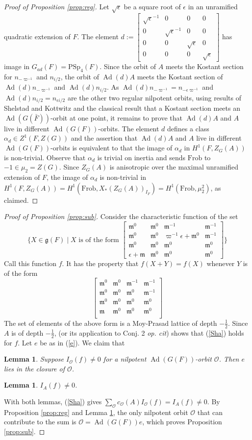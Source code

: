 \documentclass[11pt]{amsart}
\newtheorem{lemma}[theorem]{Lemma}
\theoremstyle{remark}
\newcommand{\cO}{\mathcal{O}}
\newcommand{\Ad}{\operatorname{Ad}}
\newcommand{\Frob}{\mathrm{Frob}}
\newcommand{\fg}{\mathfrak{g}}
\newcommand{\fm}{\mathfrak{m}}
\newcommand{\matr}[1]{\left[\begin{matrix}#1\end{matrix}\right]}
\newcommand{\PSp}{\mathrm{PSp}}
\begin{document}
\begin{proof}[Proof of Proposition \ref{prop:reg}]
Let $\sqrt{\epsilon}$ be a square root of $\epsilon$ in an unramified quadratic extension of $F$. The element $d:=\matr{
\sqrt{\epsilon}^{-1}&0&0&0\\
0&\sqrt{\epsilon}^{-1}&0&0\\
0&0&\sqrt{\epsilon}&0\\
0&0&0&\sqrt{\epsilon}
}$ has image in $G_{ad}(F)=\PSp_4(F)$. Since the orbit of $A$ meets the Kostant section for $n_{-\varpi^{-1}}$ and $n_{i/2}$, the orbit of $\Ad(d)A$ meets the Kostant section of $\Ad(d)n_{-\varpi^{-1}}$ and $\Ad(d)n_{i/2}$. As $\Ad(d)n_{-\varpi^{-1}}=n_{-\epsilon \varpi^{-1}}$ and $\Ad(d)n_{i/2}=n_{\epsilon i/2}$ are the other two regular nilpotent orbits, using results of Shelstad and Kottwitz and the classical result that a Kostant section meets an $\Ad(G(\bar{F}))$-orbit at one point, it remains to prove that $\Ad(d)A$ and $A$ live in different $\Ad(G(F))$-orbits. The element $d$ defines a class $\alpha_d\in Z^1(F,Z(G))$ and the assertion that $\Ad(d)A$ and $A$ live in different $\Ad(G(F))$-orbits is equivalent to that the image of $\alpha_d$ in $H^1(F,Z_G(A))$ is non-trivial. Observe that $\alpha_d$ is trivial on inertia and sends $\Frob$ to $-1\in\mu_2=Z(G)$. Since $Z_G(A)$ is anisotropic over the maximal unramified extension of $F$, the image of $\alpha_d$ is non-trivial in $H^1(F,Z_G(A))=H^1(\Frob,X_*(Z_G(A))_{I_F})=H^1(\Frob,\mu_2^2)$, as claimed.
\end{proof}

\begin{proof}[Proof of Proposition \ref{prop:sub}]
Consider the characteristic function of the set
\[
\{X\in\fg(F)\;|\;X\text{ is of the form }
\matr{
\fm^0&\fm^0&\fm^{-1}&\fm^{-1}\\
\fm^0&\fm^0&\varpi^{-1}\epsilon+\fm^0&\fm^{-1}\\
\fm^0&\fm^0&\fm^0&\fm^0\\
\epsilon+\fm&\fm^0&\fm^0&\fm^0
}
\}
\]
Call this function $f$. It has the property that $f(X+Y)=f(X)$ whenever $Y$ is of the form
\[
\matr{
	\fm^0&\fm^0&\fm^{-1}&\fm^{-1}\\
	\fm^0&\fm^0&\fm^0&\fm^{-1}\\
	\fm^0&\fm^0&\fm^0&\fm^0\\
	\fm&\fm^0&\fm^0&\fm^0\\
}
\]
The set of elements of the above form is a Moy-Prasad lattice of depth $-\frac{1}{2}$. Since $A$ is of depth $-\frac{1}{2}$, \cite[Thm 2.1.5]{De02a} (or its application to Conj. 2 {\it op. cit}) shows that (\ref{Sha}) holds for $f$. Let $e$ be as in (\ref{e}). We claim that
\begin{lemma}\label{nil} Suppose $I_{\cO}(f)\not=0$ for a nilpotent $\Ad(G(F))$-orbit $\cO$. Then $e$ lies in the closure of $\cO$. 
\end{lemma}
\begin{lemma}\label{rs} $I_A(f)\not=0$.
\end{lemma}
With both lemmas, (\ref{Sha}) gives
$\sum_{\cO}c_{\cO}(A)I_{\cO}(f)=I_A(f)\not=0$. By Proposition \ref{prop:reg} and Lemma \ref{nil}, the only nilpotent orbit $\cO$ that can contribute to the sum is $\cO=\Ad(G(F))e$, which proves Proposition \ref{prop:sub}.
\end{proof}
\end{document}
